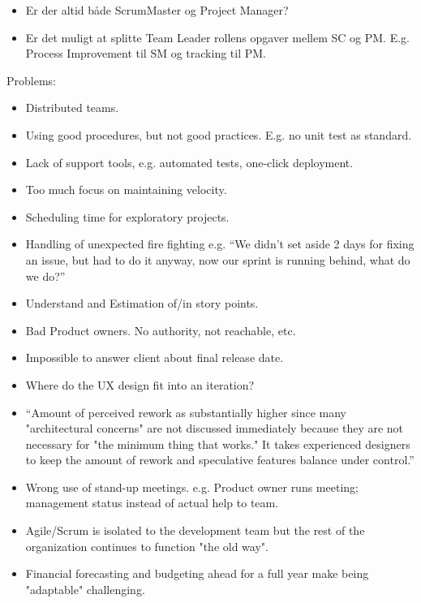  \newpage
\begin{itemize}
	\item Er der altid både ScrumMaster og Project Manager?
	\item Er det muligt at splitte Team Leader rollens opgaver mellem SC og PM. E.g. Process Improvement til SM og tracking til PM.
\end{itemize}







Problems:
\begin{itemize}
	\item Distributed teams.
	\item Using good procedures, but not good practices. E.g. no unit test as standard.
	\item Lack of support tools, e.g. automated tests, one-click deployment.
	\item Too much focus on maintaining velocity.
	\item Scheduling time for exploratory projects.
	\item Handling of unexpected fire fighting e.g. “We didn't set aside 2 days for fixing an issue, but had to do it anyway, now our sprint is running behind, what do we do?”
	\item Understand and Estimation of/in story points.
	\item Bad Product owners. No authority, not reachable, etc.
	\item Impossible to answer client about final release date.
	\item Where do the UX design fit into an iteration?
	\item “Amount of perceived rework as substantially higher since many "architectural concerns" are not discussed immediately because they are not necessary for "the minimum thing that works." It takes experienced designers to keep the amount of rework and speculative features balance under control.”
	\item Wrong use of stand-up meetings. e.g. Product owner runs meeting; management status instead of actual help to team.
	\item Agile/Scrum is isolated to the development team but the rest of the organization continues to function "the old way".
	\item Financial forecasting and budgeting ahead for a full year make being "adaptable" challenging.

\end{itemize}
